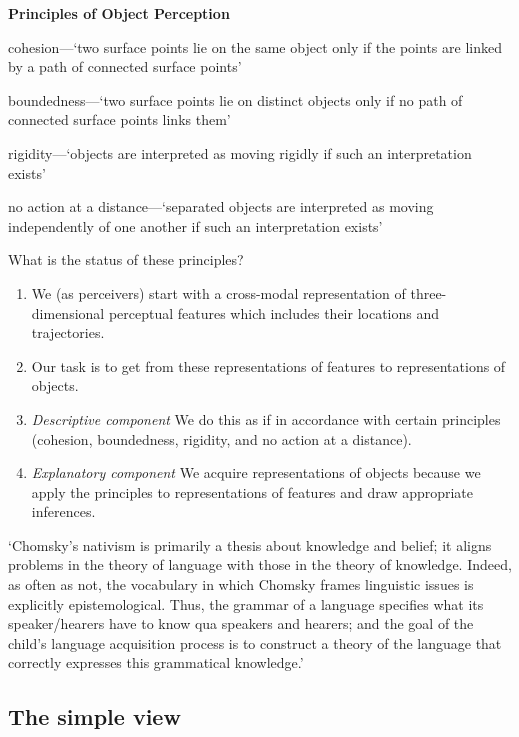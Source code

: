 \documentclass[12pt]{extarticle}
\begin{document}
\begin{multicols}{3}
\textbf{Principles of Object Perception \citep{Spelke:1990jn}}
 
cohesion—‘two surface points lie on the same object only if the points are linked by a path of connected surface points’
 
boundedness—‘two surface points lie on distinct objects only if no path of connected surface points links them’
 
rigidity—‘objects are interpreted as moving rigidly if such an interpretation exists’
 
no action at a distance—‘separated objects are interpreted as moving independently of one another if such an interpretation exists’
 
 
What is the status of these principles?
\begin{enumerate}

\item We (as perceivers) start with a cross-modal representation of three-dimensional perceptual features which includes their locations and trajectories.

\item Our task is to get from these representations of features to representations of objects.

\item \emph{Descriptive component} We do this as if in accordance with certain principles (cohesion, boundedness, rigidity, and no action at a distance).

\item \emph{Explanatory component} We acquire representations of objects because we apply the principles to representations of features and draw appropriate inferences.

\end{enumerate}

 
‘Chomsky’s nativism is primarily a thesis about knowledge and belief; it aligns problems in the theory of language with those in the theory of knowledge. Indeed, as often as not, the vocabulary in which Chomsky frames linguistic issues is explicitly epistemological. Thus, the grammar of a language specifies what its speaker/hearers have to know qua speakers and hearers; and the goal of the child’s language acquisition process is to construct a theory of the language that correctly expresses this grammatical knowledge.’
\citep[p.\ 11]{Fodor:2000cj}
 
\subsection{The simple view}
 

\end{multicols}
\end{document}
